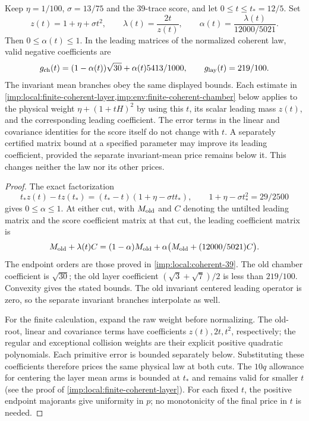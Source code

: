 \begin{proposition}
\label{imp:local:coherent-parameter}
\label{imp:env:coherent-parameter}
Keep $\eta=1/100$, $\sigma=13/75$ and the 39-trace score, and let
$0\le t\le t_*=12/5$. Set
\begin{equation}\label{eq:merge-local-I-43}
 z(t)=1+\eta+\sigma t^2,\qquad
 \lambda(t)=\frac{2t}{z(t)},\qquad
 \alpha(t)=\frac{\lambda(t)}{12000/5021}.
\end{equation}
Then $0\le\alpha(t)\le1$. In the leading matrices of the normalized
coherent law, valid negative coefficients are
\[
 g_{\rm ch}(t)=(1-\alpha(t))\sqrt{30}
                   +\alpha(t)\frac{5413}{1000},\qquad
 g_{\rm lay}(t)=\frac{219}{100}.
\]
The invariant mean branches obey the same displayed bounds.
Each estimate in \cref{imp:local:finite-coherent-layer,imp:env:finite-coherent-chamber}
below applies to the physical weight
$\eta+(1+tH)^2$ by using this $t$, its scalar leading mass $z(t)$,
and the corresponding leading coefficient. The error terms in the linear and covariance identities for
the score itself do not change with $t$. A separately certified matrix bound
at a specified parameter may improve its leading coefficient, provided
the separate invariant-mean price remains below it. This changes neither
the law nor its other prices.
\end{proposition}

\begin{proof}
The exact factorization
\begin{equation}\label{eq:merge-local-I-44}
 t_*z(t)-tz(t_*)=(t_*-t)(1+\eta-\sigma tt_*),\qquad
 1+\eta-\sigma t_*^2=29/2500
\end{equation}
gives $0\le\alpha\le1$. At either cut, with $M_{\rm old}$ and $C$ denoting the untilted leading matrix and the score coefficient matrix at that cut, the leading coefficient matrix is
\[
 M_{\rm old}+\lambda(t)C
 =(1-\alpha)M_{\rm old}
       +\alpha\bigl(M_{\rm old}+(12000/5021)C\bigr).
\]
The endpoint orders are those proved in
\cref{imp:local:coherent-39}. The old chamber coefficient is $\sqrt{30}$;
the old layer coefficient $(\sqrt3+\sqrt7)/2$ is less than $219/100$.
Convexity gives the stated bounds. The old invariant centered leading
operator is zero, so the separate invariant branches interpolate as well.

For the finite calculation, expand the raw weight before normalizing.
The old-root, linear and covariance terms have coefficients
$z(t),2t,t^2$, respectively; the regular and exceptional collision
weights are their explicit positive quadratic polynomials. Each
primitive error is bounded separately below. Substituting these
coefficients therefore prices the same physical law at both cuts.
The $10q$ allowance for centering the layer mean arms is bounded at
$t_*$ and remains valid for smaller $t$ (see the proof of \cref{imp:local:finite-coherent-layer}). For each fixed $t$, the
positive endpoint majorants give uniformity in $p$; no monotonicity
of the final price in $t$ is needed.
\end{proof}

